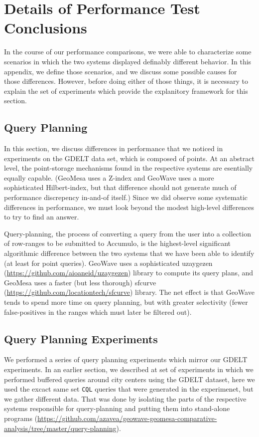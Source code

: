 \section{Details of Performance Test Conclusions}
\label{appendix:planning}

In the course of our performance comparisons, we were able to characterize some scenarios in which the two systems displayed definably different behavior.
In this appendix, we define those scenarios, and we discuss some possible causes for those differences.
However, before doing either of those things, it is necessary to explain the set of experiments which provide the explanitory framework for this section.

\subsection{Query Planning}

In this section, we discuss differences in performance that we noticed in experiments on the GDELT data set, which is composed of points.
At an abstract level, the point-storage mechanisms found in the respective systems are esentially equally capable.
(GeoMesa uses a Z-index and GeoWave uses a more sophisticated Hilbert-index, but that difference should not generate much of performance discrepency in-and-of itself.)
Since we did observe some systematic differences in performance, we must look beyond the modest high-level differences to try to find an answer.

Query-planning, the process of converting a query from the user into a collection of row-ranges to be submitted to Accumulo, is the highest-level significant algorithmic difference between the two systems that we have been able to identify (at least for point queries).
GeoWave uses a sophisticated uzaygezen (\url{https://github.com/aioaneid/uzaygezen}) library to compute its query plans,
and GeoMesa uses a faster (but less thorough) sfcurve (\url{https://github.com/locationtech/sfcurve}) library.
The net effect is that GeoWave tends to spend more time on query planning,
but with greater selectivity (fewer false-positives in the ranges which must later be filtered out).

\subsection{Query Planning Experiments}

We performed a series of query planning experiments which mirror our GDELT experiments.
In an earlier section, we described at set of experiments in which we performed buffered queries around city centers using the GDELT dataset, here we used the excact same set \texttt{CQL} queries that were generated in the experimenet, but we gather different data.
That was done by isolating the parts of the respective systems responsible for query-planning and putting them into stand-alone programs (\url{https://github.com/azavea/geowave-geomesa-comparative-analysis/tree/master/query-planning}).

